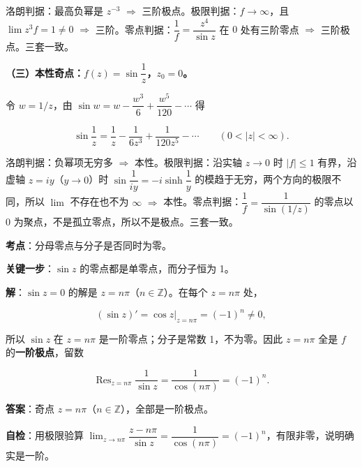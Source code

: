 \documentclass[11pt]{ctexart}
\renewcommand{\qbreak}{\needspace{0.45\textheight}}
\let\origsubhdr\subhdr
\renewcommand{\subhdr}[1]{\par\needspace{4\baselineskip}\origsubhdr{#1}}
\let\orighdr\hdr
\renewcommand{\hdr}[2]{\par\needspace{9\baselineskip}\orighdr{#1}{#2}}
\begin{document}
洛朗判据：最高负幂是 $z^{-3}$ $\Rightarrow$ 三阶极点。极限判据：$f\to\infty$，且 $\lim z^3f=1\ne0$ $\Rightarrow$ 三阶。零点判据：$\dfrac1f=\dfrac{z^4}{\sin z}$ 在 $0$ 处有三阶零点 $\Rightarrow$ 三阶极点。三套一致。

\textbf{（三）本性奇点：$f(z)=\sin\dfrac1z$，$z_0=0$。}

令 $w=1/z$，由 $\sin w=w-\dfrac{w^3}{6}+\dfrac{w^5}{120}-\cdots$ 得

\[ \sin\frac1z=\frac1z-\frac{1}{6z^3}+\frac{1}{120z^5}-\cdots\qquad(0<|z|<\infty) . \]

洛朗判据：负幂项无穷多 $\Rightarrow$ 本性。极限判据：沿实轴 $z\to0$ 时 $|f|\le1$ 有界，沿虚轴 $z=iy$（$y\to0$）时 $\sin\dfrac{1}{iy}=-i\sinh\dfrac1y$ 的模趋于无穷，两个方向的极限不同，所以 $\lim$ 不存在也不为 $\infty$ $\Rightarrow$ 本性。零点判据：$\dfrac1f=\dfrac{1}{\sin(1/z)}$ 的零点以 $0$ 为聚点，不是孤立零点，所以不是极点。三套一致。


\qbreak
{}

\textbf{考点}：分母零点与分子是否同时为零。

\textbf{关键一步}：$\sin z$ 的零点都是单零点，而分子恒为 1。

\textbf{解}：$\sin z=0$ 的解是 $z=n\pi$（$n\in\mathbb{Z}$）。在每个 $z=n\pi$ 处，

\[ (\sin z)'=\cos z\Big|_{z=n\pi}=(-1)^n\ne0 , \]

所以 $\sin z$ 在 $z=n\pi$ 是一阶零点；分子是常数 1，不为零。因此 $z=n\pi$ 全是 $f$ 的\textbf{一阶极点}，留数

\[ \operatorname{Res}_{z=n\pi}\frac{1}{\sin z}=\frac{1}{\cos(n\pi)}=(-1)^n . \]

\textbf{答案}：奇点 $z=n\pi$（$n\in\mathbb{Z}$），全部是一阶极点。

\textbf{自检}：用极限验算 $\lim_{z\to n\pi}\dfrac{z-n\pi}{\sin z}=\dfrac{1}{\cos(n\pi)}=(-1)^n$，有限非零，说明确实是一阶。


\end{document}
